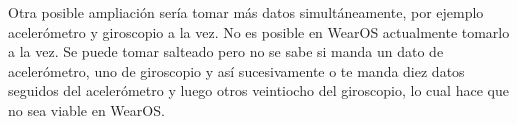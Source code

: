 \documentclass[12pt]{article}
\numberwithin{equation}{section}
\begin{document}
Otra posible ampliación sería tomar más datos simultáneamente, por ejemplo acelerómetro y giroscopio a la vez. No es posible en WearOS actualmente tomarlo a la vez. Se puede tomar salteado pero no se sabe si manda un dato de acelerómetro, uno de giroscopio y así sucesivamente o te manda diez datos seguidos del acelerómetro y luego otros veintiocho del giroscopio, lo cual hace que no sea viable en WearOS.




\newpage
\nocite{s150818901}


\end{document}
